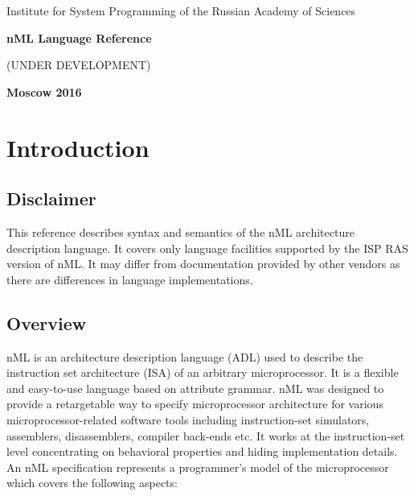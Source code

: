 \documentclass[oneside,final,14pt]{extreport}
\begin{document}
\begin{titlepage}
\begin{center}
\Large{Institute for System Programming of the Russian Academy of Sciences}

\vfill


\bf\Large{nML Language Reference}

(UNDER DEVELOPMENT)

\vfill

\bf
Moscow 2016
\end{center}
\end{titlepage}


\newpage
{} %
\tableofcontents


\chapter{Introduction}


\section{Disclaimer}

This reference describes syntax and semantics of the nML architecture
description language. It covers only language facilities supported by the ISP RAS
version of nML. It may differ from documentation provided by other vendors as
there are differences in language implementations.


\section{Overview}

nML is an architecture description language (ADL) used to describe the
instruction set architecture (ISA) of an arbitrary microprocessor. It is a
flexible and easy-to-use language based on attribute grammar. nML was designed
to provide a retargetable way to specify microprocessor architecture for
various microprocessor-related software tools including instruction-set
simulators, assemblers, disassemblers, compiler back-ends etc. It works at
the instruction-set level concentrating on behavioral properties and hiding
implementation details. An nML specification represents a programmer's model
of the microprocessor which covers the following aspects:
\end{document}
